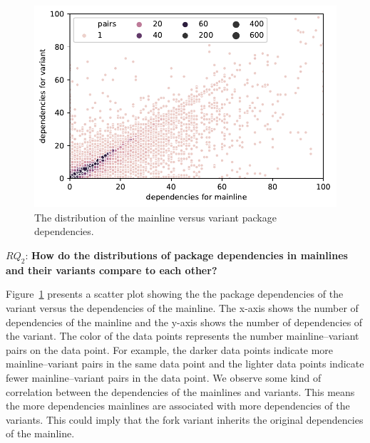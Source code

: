 \begin{figure}[htbp]
\vspace{-.3cm}
   \centering
    \includegraphics[scale=0.5]{figures/benevolj_dependencies.pdf}
    \caption{The distribution of the mainline versus variant package dependencies.}
    \label{fig:dependencies}
\end{figure}


$RQ_2$: \textbf{How do the distributions of package dependencies in mainlines and their variants compare to each other?}

Figure~\ref{fig:dependencies} presents a scatter plot showing the the package dependencies of the variant versus the dependencies of the mainline.
The x-axis shows the number of dependencies of the mainline and
the y-axis shows the number of dependencies of the variant.
The color of the data points represents the number mainline--variant pairs on the data point.
For example, the darker data points indicate more mainline--variant pairs in the same data point and the lighter data points indicate fewer mainline--variant pairs in the data point. 
We observe some kind of correlation between the dependencies of the mainlines and variants. 
This means the more dependencies mainlines are associated with more dependencies of the variants. This could imply that the fork variant inherits the original dependencies of the mainline.


